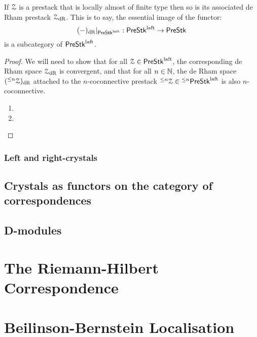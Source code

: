                 \begin{proposition} \label{prop: laft_de_rham_spaces}
                    If $\mathcal{Z}$ is a prestack that is locally almost of finite type then so is its associated de Rham prestack $\mathcal{Z}_{\mathrm{dR}}$. This is to say, the essential image of the functor:
                        $$(-)_{\mathrm{dR}}|_{\mathsf{Pre}\mathsf{Stk}^{\mathrm{laft}}}: \mathsf{Pre}\mathsf{Stk}^{\mathrm{laft}} \to \mathsf{Pre}\mathsf{Stk}$$
                    is a subcategory of $\mathsf{Pre}\mathsf{Stk}^{\mathrm{laft}}$.
                \end{proposition}
                    \begin{proof}
                        We will need to show that for all $\mathcal{Z} \in \mathsf{Pre}\mathsf{Stk}^{\mathrm{laft}}$, the corresponding de Rham space $\mathcal{Z}_{\mathrm{dR}}$ is convergent, and that for all $n \in \mathbb{N}$, the de Rham space $({}^{\leq n}\mathcal{Z})_{\mathrm{dR}}$ attached to the $n$-coconnective prestack ${}^{\leq n}\mathcal{Z} \in {}^{\leq n}\mathsf{Pre}\mathsf{Stk}^{\mathrm{laft}}$ is also $n$-coconnective.
                            \begin{enumerate}
                                \item 
                                \item 
                            \end{enumerate}
                    \end{proof}
                
                \begin{remark} \label{remark: universal_property_of_de_rham_spaces}
                    
                \end{remark}
                    
            \subsubsection{Left and right-crystals}
        
        \subsection{Crystals as functors on the category of correspondences}
        
        \subsection{D-modules}
        
    \section{The Riemann-Hilbert Correspondence}
    
    \section{Beilinson-Bernstein Localisation}